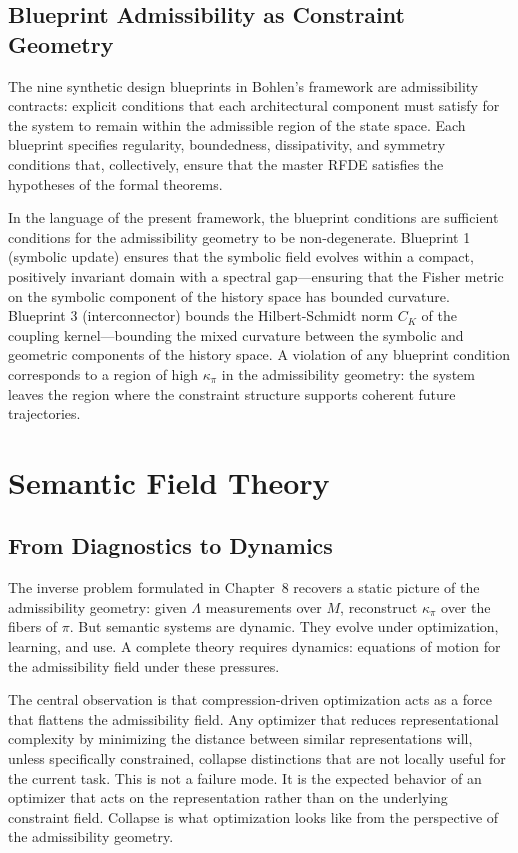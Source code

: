 \documentclass[12pt, oneside]{book}
\theoremstyle{plain-flyxion}
\theoremstyle{definition-flyxion}
\newcommand{\kpi}{\kappa_{\pi}}
\newcommand{\Lam}{\Lambda}
\begin{document}
\section{Blueprint Admissibility as Constraint Geometry}

The nine synthetic design blueprints in Bohlen's framework are admissibility contracts:
explicit conditions that each architectural component must satisfy for the system to
remain within the admissible region of the state space. Each blueprint specifies
regularity, boundedness, dissipativity, and symmetry conditions that, collectively,
ensure that the master RFDE satisfies the hypotheses of the formal theorems.

In the language of the present framework, the blueprint conditions are sufficient
conditions for the admissibility geometry to be non-degenerate. Blueprint 1 (symbolic
update) ensures that the symbolic field evolves within a compact, positively invariant
domain with a spectral gap---ensuring that the Fisher metric on the symbolic component of
the history space has bounded curvature. Blueprint 3 (interconnector) bounds the
Hilbert-Schmidt norm $C_K$ of the coupling kernel---bounding the mixed curvature between
the symbolic and geometric components of the history space. A violation of any blueprint
condition corresponds to a region of high $\kpi$ in the admissibility geometry: the
system leaves the region where the constraint structure supports coherent future
trajectories.

\chapter{Semantic Field Theory}

\section{From Diagnostics to Dynamics}

The inverse problem formulated in Chapter~8 recovers a static picture of the admissibility
geometry: given $\Lam$ measurements over $M$, reconstruct $\kpi$ over the fibers of
$\pi$. But semantic systems are dynamic. They evolve under optimization, learning, and
use. A complete theory requires dynamics: equations of motion for the admissibility field
under these pressures.

The central observation is that compression-driven optimization acts as a force that
flattens the admissibility field. Any optimizer that reduces representational complexity
by minimizing the distance between similar representations will, unless specifically
constrained, collapse distinctions that are not locally useful for the current task. This
is not a failure mode. It is the expected behavior of an optimizer that acts on the
representation rather than on the underlying constraint field. Collapse is what
optimization looks like from the perspective of the admissibility geometry.
\end{document}
